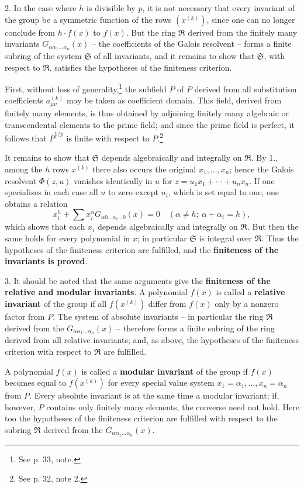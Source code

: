 2. In the case where $h$ is divisible by $p$, it is not necessary that every invariant of the group be a symmetric function of the rows $(x^{(k)})$, since one can no longer conclude from $h\cdot f(x)$ to $f(x)$. But the ring $\mathfrak R$ derived from the finitely many invariants $G_{\alpha\alpha_1\ldots\alpha_n}(x)$ -- the coefficients of the Galois resolvent -- forms a finite subring of the system $\mathfrak S$ of all invariants, and it remains to show that $\mathfrak S$, with respect to $\mathfrak R$, satisfies the hypotheses of the finiteness criterion.

First, without loss of generality,\footnote{See p. 33, note.} the subfield $\overline P$ of $P$ derived from all substitution coefficients $a_{\mu\nu}^{(k)}$ may be taken as coefficient domain. This field, derived from finitely many elements, is thus obtained by adjoining finitely many algebraic or transcendental elements to the prime field; and since the prime field is perfect, it follows that $\overline P^{1/p}$ is finite with respect to $\overline P$.\footnote{See p. 32, note 2.}

It remains to show that $\mathfrak S$ depends algebraically and integrally on $\mathfrak R$. By 1., among the $h$ rows $x^{(k)}$ there also occurs the original $x_1,
\ldots,x_n$; hence the Galois resolvent $\Phi(z,u)$ vanishes identically in $u$ for $z=u_1x_1+\cdots+u_nx_n$. If one specializes in each case all $u$ to zero except $u_i$, which is set equal to one, one obtains a relation
\[
 x_i^h+\sum x_i^\alpha G_{\alpha0\ldots\alpha_i\ldots0}(x)=0
 \quad (\alpha\ne h;\ \alpha+\alpha_i=h),
\]
which shows that each $x_i$ depends algebraically and integrally on $\mathfrak R$. But then the same holds for every polynomial in $x$; in particular $\mathfrak S$ is integral over $\mathfrak R$. Thus the hypotheses of the finiteness criterion are fulfilled, and the \textbf{finiteness of the invariants is proved}.

3. It should be noted that the same arguments give the \textbf{finiteness of the relative and modular invariants}. A polynomial $f(x)$ is called a \textbf{relative invariant} of the group if all $f(x^{(k)})$ differ from $f(x)$ only by a nonzero factor from $P$. The system of absolute invariants -- in particular the ring $\mathfrak R$ derived from the $G_{\alpha\alpha_1\ldots\alpha_n}(x)$ -- therefore forms a finite subring of the ring derived from all relative invariants; and, as above, the hypotheses of the finiteness criterion with respect to $\mathfrak R$ are fulfilled.

A polynomial $f(x)$ is called a \textbf{modular invariant} of the group if $f(x)$ becomes equal to $f(x^{(k)})$ for every special value system $x_1=\alpha_1,
\ldots,x_n=\alpha_n$ from $P$. Every absolute invariant is at the same time a modular invariant; if, however, $P$ contains only finitely many elements, the converse need not hold. Here too the hypotheses of the finiteness criterion are fulfilled with respect to the subring $\mathfrak R$ derived from the $G_{\alpha\alpha_1\ldots\alpha_n}(x)$.


\clearpage

